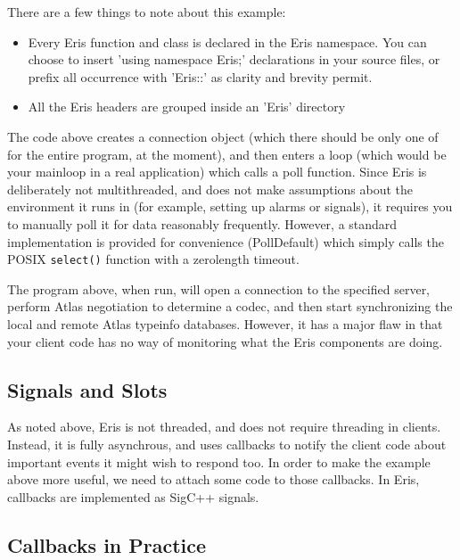 There are a few things to note about this example:

\begin{itemize}

\item Every Eris function and class is declared in the Eris namespace. You can choose
to insert 'using namespace Eris;' declarations in your source files, or prefix all
occurrence with 'Eris::' as clarity and brevity permit.

\item All the Eris headers are grouped inside an 'Eris' directory 

\end{itemize}



The code above creates a connection object (which there should be only one of for the entire
program, at the moment), and then enters a loop (which would be your mainloop in a real
application) which calls a poll function. Since Eris is deliberately not multithreaded,
and does not make assumptions about the environment it runs in (for example, setting up
alarms or signals), it requires you to manually poll it for data reasonably frequently.
However, a standard implementation is provided for convenience (PollDefault) which
simply calls the POSIX {\tt select()} function with a zerolength timeout.



The program above, when run, will open a connection to the specified server, perform
Atlas negotiation to determine a codec, and then start synchronizing the local and remote
Atlas typeinfo databases. However, it has a major flaw in that your client code has no
way of monitoring what the Eris components are doing.



\subsection{Signals and Slots}



As noted above, Eris is not threaded, and does not require threading in clients. Instead,
it is fully asynchrous, and uses callbacks to notify the client code about important
events it might wish to respond too. In order to make the example above more useful,
we need to attach some code to those callbacks. In Eris, callbacks are implemented as
SigC++ signals.



\subsection{Callbacks in Practice}



